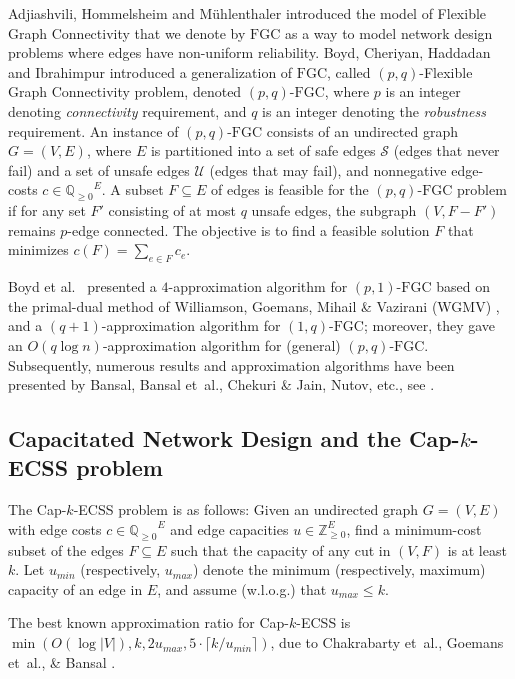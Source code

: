 \documentclass[11pt]{article}
\newcommand{\Q}{\ensuremath{\mathbb Q}}
\newcommand{\Qp}{\ensuremath{\Q_{\geq 0}}}
\newcommand{\safe}{\mathscr{S}}
\newcommand{\unsafe}{\mathscr{U}}
\newcommand{\fgc}{\mathrm{FGC}}
\newcommand{\pqfgc}{(p,q)\text{-}\fgc}
\newcommand{\ponefgc}{(p,1)\text{-}\fgc}
\newcommand{\oneqfgc}{(1,q)\text{-}\fgc}
\newcommand{\pliableapx}{5}
\begin{document}
Adjiashvili, Hommelsheim and M\"uhlenthaler \cite{AHM21}
introduced the model of Flexible Graph Connectivity that we denote by $\fgc$ as a way to model network design problems where edges have non-uniform reliability. 
Boyd, Cheriyan, Haddadan and Ibrahimpur \cite{BCHI23} introduced a
generalization of $\fgc$, called $(p,q)$-Flexible Graph Connectivity problem, denoted $\pqfgc$, where $p$ is
an integer denoting {\em connectivity} requirement, and $q$ is an integer denoting the {\em robustness} requirement.
An instance of $\pqfgc$ consists of an undirected graph $G = (V,E)$, where $E$ is partitioned into
a set of safe edges $\safe$ (edges that never fail) and a set of unsafe edges $\unsafe$ (edges that may fail),
and nonnegative edge-costs $c \in \Qp^E$.  A subset $F \subseteq
E$ of edges is feasible for the $\pqfgc$ problem if for any set
$F'$ consisting of at most $q$ unsafe edges, the subgraph $(V, F-F')$
remains $p$-edge connected. The objective is to find a
feasible solution $F$ that minimizes $c(F) = \sum_{e \in F} c_e$.

Boyd et al.\ \cite{BCHI23} presented a $4$-approximation algorithm
for $\ponefgc$ based on the
primal-dual method of Williamson, Goemans, Mihail \& Vazirani (WGMV) \cite{WGMV95}, and a
$(q+1)$-approximation algorithm for $\oneqfgc$; moreover, they gave
an $O(q \log n)$-approximation algorithm for (general) $\pqfgc$.
Subsequently, numerous results and approximation algorithms have been presented by
Bansal, Bansal et~al., Chekuri \& Jain, Nutov, etc., see \cite{B2023,BCGI24,CJ23,N2024}.


\subsection*{Capacitated Network Design and the Cap-$k$-ECSS problem}

The Cap-$k$-ECSS problem is as follows:
Given an undirected graph $G = (V,E)$ with edge costs $c \in \Qp^E$ and
edge capacities $u \in \mathbb{Z}_{\geq 0}^E$, find a minimum-cost
subset of the edges $F\subseteq E$ such that the capacity of any
cut in $(V,F)$ is at least $k$.
Let $u_{min}$ (respectively, $u_{max}$) denote the minimum (respectively,
maximum) capacity of an edge in $E$, and assume (w.l.o.g.) that $u_{max} \leq k$.

The best known approximation ratio for Cap-$k$-ECSS is
$\min(O(\log{|V|}), k, 2u_{max}, \pliableapx \cdot {\lceil k/u_{min} \rceil})$, due to
Chakrabarty et~al., Goemans et~al., \& Bansal \cite{CCKK15,GGPSTW94,B2023}.
\end{document}
